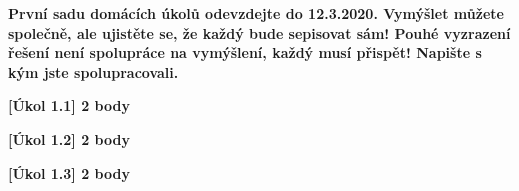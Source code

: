 \textbf{
	První sadu domácích úkolů odevzdejte do 12.3.2020.
	Vymýšlet můžete společně, ale ujistěte se, že každý bude sepisovat sám!
	Pouhé vyzrazení řešení není spolupráce na vymýšlení, každý musí přispět!
	Napište s kým jste spolupracovali.
}

\textbf{[Úkol 1.1] 2 body}

\textbf{[Úkol 1.2] 2 body}

\textbf{[Úkol 1.3] 2 body}


